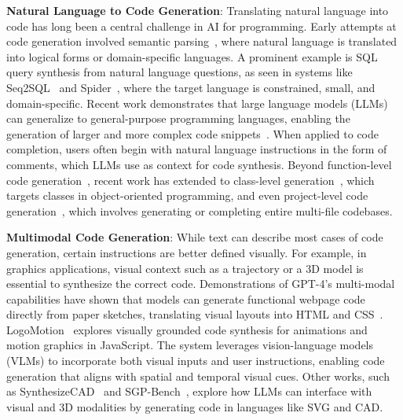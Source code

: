 \textbf{Natural Language to Code Generation}:
Translating natural language into code has long been a central challenge in AI for programming. 
Early attempts at code generation involved semantic parsing~\citep{zettlemoyer2012learningmapsentenceslogical, wong2006learning}, where natural language is translated into logical forms or domain-specific languages. 
A prominent example is SQL query synthesis from natural language questions, as seen in systems like Seq2SQL~\citep{zhong2017seq2sql} and Spider~\citep{yu2019spider}, where the target language is constrained, small, and domain-specific.
Recent work demonstrates that large language models (LLMs) can generalize to general-purpose programming languages, enabling the generation of larger and more complex code snippets~\citep{openai2023gpt}. 
When applied to code completion, users often begin with natural language instructions in the form of comments, which LLMs use as context for code synthesis.
Beyond function-level code generation~\citep{austin2021program, chen2021evaluating}, recent work has extended to class-level generation~\citep{du2023classeval}, which targets classes in object-oriented programming, and even project-level code generation~\citep{cao2024javabench, wang2024oopeval}, which involves generating or completing entire multi-file codebases.

\textbf{Multimodal Code Generation}:
While text can describe most cases of code generation, certain instructions are better defined visually. 
For example, in graphics applications, visual context such as a trajectory or a 3D model is essential to synthesize the correct code. 
Demonstrations of GPT-4's multi-modal capabilities have shown that models can generate functional webpage code directly from paper sketches, translating visual layouts into HTML and CSS~\citep{openai2023gpt4demo}.
LogoMotion~\citep{liu2025logomotionvisuallygroundedcodesynthesis} explores visually grounded code synthesis for animations and motion graphics in JavaScript. 
The system leverages vision-language models (VLMs) to incorporate both visual inputs and user instructions, enabling code generation that aligns with spatial and temporal visual cues.
Other works, such as SynthesizeCAD~\citep{nandi2020synthesizecad} and SGP-Bench~\citep{qiu2024largelanguagemodelsunderstand}, explore how LLMs can interface with visual and 3D modalities by generating code in languages like SVG and CAD.

